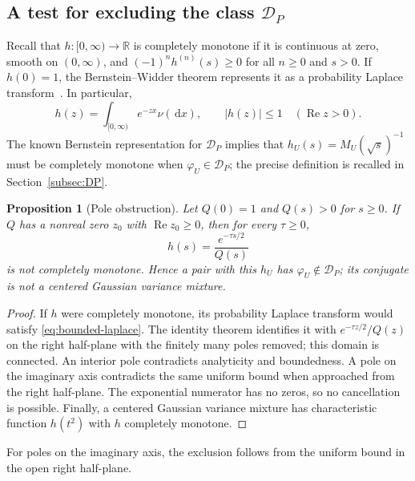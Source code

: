 \documentclass[11pt,twoside]{article}
\theoremstyle{journalplain}
\numberwithin{equation}{section}
\newtheorem{proposition}[theorem]{Proposition}
\theoremstyle{journaldefinition}
\newcommand{\R}{\mathbb R}
\newcommand{\DP}{\mathcal D_P}
\newcommand{\dd}{\,\mathrm d}
\DeclareMathOperator{\Ree}{Re}
\begin{document}
\subsection{A test for excluding the class \texorpdfstring{$\DP$}{D-P}}
Recall that $h:[0,\infty)\to\R$ is completely monotone if it is continuous at zero, smooth on $(0,\infty)$, and $(-1)^n h^{(n)}(s)\ge0$ for all $n\ge0$ and $s>0$. If $h(0)=1$, the Bernstein--Widder theorem represents it as a probability Laplace transform\ \cite{SSV2012}. In particular,
\begin{equation}\label{eq:bounded-laplace}
 h(z)=\int_{[0,\infty)}e^{-zx}\nu(\dd x),\qquad
 |h(z)|\le1\quad(\Ree z>0).
\end{equation}
The known Bernstein representation for $\DP$ implies that $h_U(s)=M_U(\sqrt{s})^{-1}$ must be completely monotone when $\varphi_U\in\DP$; the precise definition is recalled in Section~\ref{subsec:DP}.

\begin{proposition}[Pole obstruction]\label{prop:poles}
Let $Q(0)=1$ and $Q(s)>0$ for $s\ge0$. If $Q$ has a nonreal zero $z_0$ with $\Ree z_0\ge0$, then for every $\tau\ge0$,
\[
 h(s)=\frac{e^{-\tau s/2}}{Q(s)}
\]
is not completely monotone. Hence a pair with this $h_U$ has $\varphi_U\notin\DP$; its conjugate is not a centered Gaussian variance mixture.
\end{proposition}
\begin{proof}
If $h$ were completely monotone, its probability Laplace transform would satisfy \eqref{eq:bounded-laplace}. The identity theorem identifies it with $e^{-\tau z/2}/Q(z)$ on the right half-plane with the finitely many poles removed; this domain is connected. An interior pole contradicts analyticity and boundedness. A pole on the imaginary axis contradicts the same uniform bound when approached from the right half-plane. The exponential numerator has no zeros, so no cancellation is possible. Finally, a centered Gaussian variance mixture has characteristic function $h(t^2)$ with $h$ completely monotone.
\end{proof}
For poles on the imaginary axis, the exclusion follows from the uniform bound in the open right half-plane.
\end{document}
